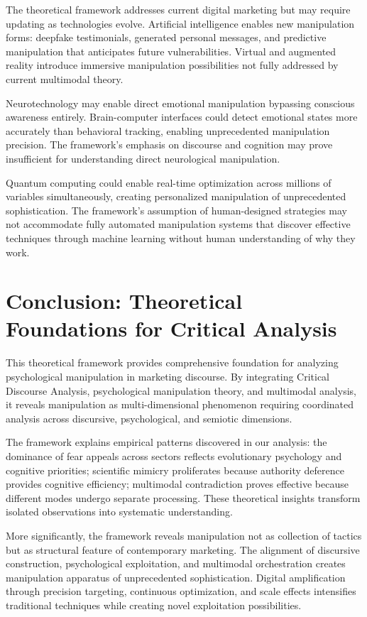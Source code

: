 The theoretical framework addresses current digital marketing but may require updating as technologies evolve. Artificial intelligence enables new manipulation forms: deepfake testimonials, generated personal messages, and predictive manipulation that anticipates future vulnerabilities. Virtual and augmented reality introduce immersive manipulation possibilities not fully addressed by current multimodal theory.

Neurotechnology may enable direct emotional manipulation bypassing conscious awareness entirely. Brain-computer interfaces could detect emotional states more accurately than behavioral tracking, enabling unprecedented manipulation precision. The framework's emphasis on discourse and cognition may prove insufficient for understanding direct neurological manipulation.

Quantum computing could enable real-time optimization across millions of variables simultaneously, creating personalized manipulation of unprecedented sophistication. The framework's assumption of human-designed strategies may not accommodate fully automated manipulation systems that discover effective techniques through machine learning without human understanding of why they work.

\section{Conclusion: Theoretical Foundations for Critical Analysis}
\label{sec:theory_conclusion}

This theoretical framework provides comprehensive foundation for analyzing psychological manipulation in marketing discourse. By integrating Critical Discourse Analysis, psychological manipulation theory, and multimodal analysis, it reveals manipulation as multi-dimensional phenomenon requiring coordinated analysis across discursive, psychological, and semiotic dimensions.

The framework explains empirical patterns discovered in our analysis: the dominance of fear appeals across sectors reflects evolutionary psychology and cognitive priorities; scientific mimicry proliferates because authority deference provides cognitive efficiency; multimodal contradiction proves effective because different modes undergo separate processing. These theoretical insights transform isolated observations into systematic understanding.

More significantly, the framework reveals manipulation not as collection of tactics but as structural feature of contemporary marketing. The alignment of discursive construction, psychological exploitation, and multimodal orchestration creates manipulation apparatus of unprecedented sophistication. Digital amplification through precision targeting, continuous optimization, and scale effects intensifies traditional techniques while creating novel exploitation possibilities.

